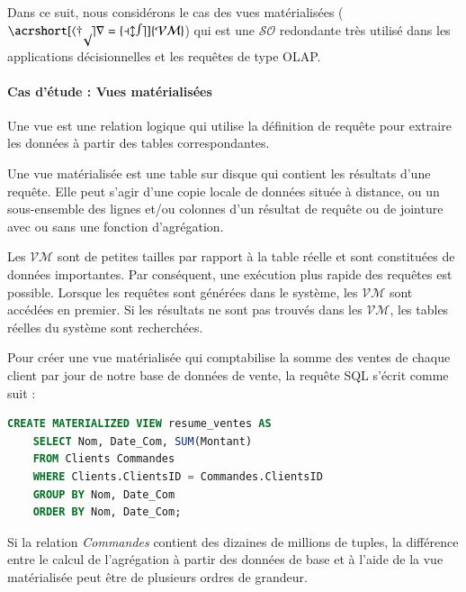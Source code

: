 Dans ce suit, nous considérons le cas des vues matérialisées ($\mathcal{\acrshort[hyper=false]{VM}}$) qui est une $\mathcal{SO}$ redondante très utilisé dans les applications décisionnelles et les requêtes de type OLAP. 
\paragraph{Cas d'étude : Vues matérialisées}\label{sec:psv}
\begin{definition}
 Une vue est une relation logique qui utilise la définition de requête pour extraire les données à partir des tables correspondantes.
\end{definition}

\begin{definition}
 Une vue matérialisée est une table sur disque qui contient les résultats d'une requête. Elle peut s'agir d'une copie locale de données située à distance, ou un sous-ensemble des lignes et/ou colonnes d'un résultat de requête ou de jointure avec ou sans une fonction d'agrégation.
\end{definition}

Les $\mathcal{VM}$ sont de petites tailles par rapport à la table réelle et sont constituées de données importantes. Par conséquent, une exécution plus rapide des requêtes est possible. Lorsque les requêtes sont générées dans le système, les $\mathcal{VM}$ sont accédées en premier. Si les résultats ne sont pas trouvés dans les $\mathcal{VM}$, les tables réelles du système sont recherchées.

\begin{example}
Pour créer une vue matérialisée qui comptabilise la somme des ventes de chaque client par jour de notre base de données de vente, la requête SQL s'écrit comme suit :
	\begin{lstlisting}[language=Sql]
	CREATE MATERIALIZED VIEW resume_ventes AS
	SELECT Nom, Date_Com, SUM(Montant)
	FROM Clients Commandes
	WHERE Clients.ClientsID = Commandes.ClientsID
	GROUP BY Nom, Date_Com
	ORDER BY Nom, Date_Com;
    \end{lstlisting}
Si la relation \textit{Commandes} contient des dizaines de millions de tuples, la différence entre le calcul de l'agrégation à partir des données de base et à l'aide de la vue matérialisée peut être de plusieurs ordres de grandeur.
\end{example}


